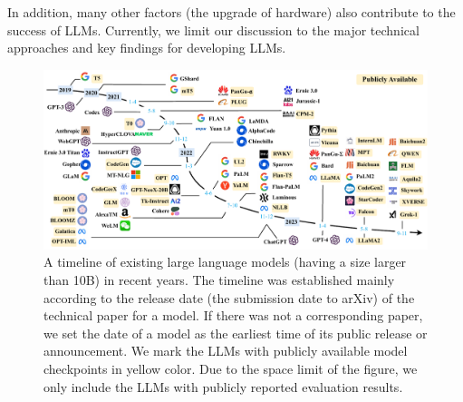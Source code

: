 In addition, many other factors (\eg the upgrade of hardware) also contribute to the success of LLMs. Currently, we limit our discussion to the major technical approaches and key findings for developing LLMs.   



\begin{figure}
    \centering
    \includegraphics[width=\textwidth]{images/LLMs-1124-final.pdf}
    \caption{A timeline of existing large language models (having a size larger than 10B) in recent years. The timeline was established mainly according to the release date (\eg the submission date to arXiv) of the technical paper for a model. If there was not a corresponding paper, we set the date of a model as the earliest time of its public release or announcement. We mark the LLMs with publicly available model checkpoints in yellow color. Due to the space limit of the figure, we only include the LLMs with publicly reported evaluation results. }
    \label{fig:llms_timeline}
\end{figure}


